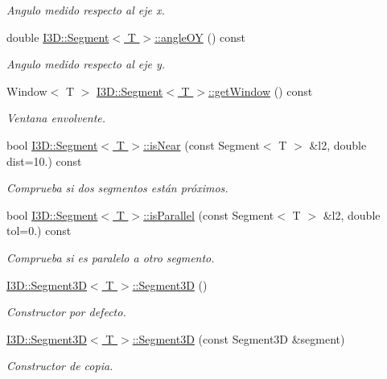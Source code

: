 \begin{DoxyCompactItemize}
\begin{DoxyCompactList}\small\item\em Angulo medido respecto al eje x. \end{DoxyCompactList}\item 
double \hyperlink{group___geometric_entities_ga324da1babfedb681fd7068fdc58d763b}{I3\+D\+::\+Segment$<$ T $>$\+::angle\+OY} () const 
\begin{DoxyCompactList}\small\item\em Angulo medido respecto al eje y. \end{DoxyCompactList}\item 
Window$<$ T $>$ \hyperlink{group___geometric_entities_ga3e11e0ecacba2003a023a21943693263}{I3\+D\+::\+Segment$<$ T $>$\+::get\+Window} () const 
\begin{DoxyCompactList}\small\item\em Ventana envolvente. \end{DoxyCompactList}\item 
bool \hyperlink{group___geometric_entities_ga59115064a0b57956175099eb3ff213ff}{I3\+D\+::\+Segment$<$ T $>$\+::is\+Near} (const Segment$<$ T $>$ \&l2, double dist=10.) const 
\begin{DoxyCompactList}\small\item\em Comprueba si dos segmentos están próximos. \end{DoxyCompactList}\item 
bool \hyperlink{group___geometric_entities_ga7a4bcb31c98bdb2e239bdb64073e8874}{I3\+D\+::\+Segment$<$ T $>$\+::is\+Parallel} (const Segment$<$ T $>$ \&l2, double tol=0.) const 
\begin{DoxyCompactList}\small\item\em Comprueba si es paralelo a otro segmento. \end{DoxyCompactList}\item 
\hyperlink{group___geometric_entities_ga726c1cdb80b816445604fc035f0b709b}{I3\+D\+::\+Segment3\+D$<$ T $>$\+::\+Segment3D} ()
\begin{DoxyCompactList}\small\item\em Constructor por defecto. \end{DoxyCompactList}\item 
\hyperlink{group___geometric_entities_gad0a6b6c727b4f675429acb7a28518cbd}{I3\+D\+::\+Segment3\+D$<$ T $>$\+::\+Segment3D} (const Segment3D \&segment)
\begin{DoxyCompactList}\small\item\em Constructor de copia. \end{DoxyCompactList}\item 

\end{DoxyCompactItemize}
